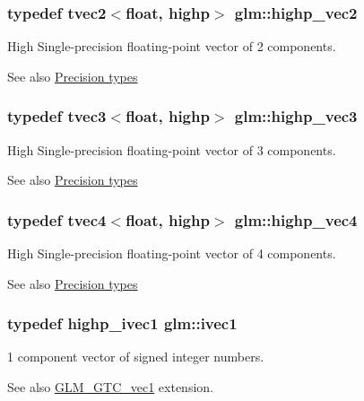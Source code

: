 \subsubsection[{highp\+\_\+vec2}]{\setlength{\rightskip}{0pt plus 5cm}typedef tvec2$<$float, highp$>$ {\bf glm\+::highp\+\_\+vec2}}\label{namespaceglm_ad48b331956b3890e02bf05a028d4869e}
High Single-\/precision floating-\/point vector of 2 components. \begin{DoxySeeAlso}{See also}
\hyperlink{group__core__precision}{Precision types} 
\end{DoxySeeAlso}
\hypertarget{namespaceglm_aea8953aeddfe3db55125a8ae05c01ed0}{}
\subsubsection[{highp\+\_\+vec3}]{\setlength{\rightskip}{0pt plus 5cm}typedef tvec3$<$float, highp$>$ {\bf glm\+::highp\+\_\+vec3}}\label{namespaceglm_aea8953aeddfe3db55125a8ae05c01ed0}
High Single-\/precision floating-\/point vector of 3 components. \begin{DoxySeeAlso}{See also}
\hyperlink{group__core__precision}{Precision types} 
\end{DoxySeeAlso}
\hypertarget{namespaceglm_a6148057fcc4a05698e2114d89bf863f1}{}
\subsubsection[{highp\+\_\+vec4}]{\setlength{\rightskip}{0pt plus 5cm}typedef tvec4$<$float, highp$>$ {\bf glm\+::highp\+\_\+vec4}}\label{namespaceglm_a6148057fcc4a05698e2114d89bf863f1}
High Single-\/precision floating-\/point vector of 4 components. \begin{DoxySeeAlso}{See also}
\hyperlink{group__core__precision}{Precision types} 
\end{DoxySeeAlso}
\hypertarget{namespaceglm_a946031cea0c22745848ebd873e6facb0}{}
\subsubsection[{ivec1}]{\setlength{\rightskip}{0pt plus 5cm}typedef {\bf highp\+\_\+ivec1} {\bf glm\+::ivec1}}\label{namespaceglm_a946031cea0c22745848ebd873e6facb0}
1 component vector of signed integer numbers. \begin{DoxySeeAlso}{See also}
\hyperlink{group__gtc__vec1}{G\+L\+M\+\_\+\+G\+T\+C\+\_\+vec1} extension. 
\end{DoxySeeAlso}
\hypertarget{namespaceglm_af22d6a46a35bcda63801fe78c033f35f}{}
